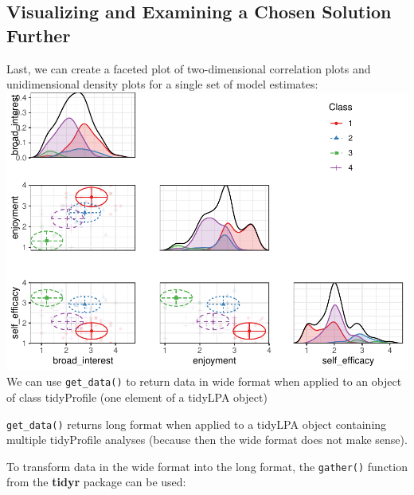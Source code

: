 \documentclass[english,man]{apa6}
\newenvironment{Shaded}{\begin{snugshade}}{\end{snugshade}}
\newcommand{\DecValTok}[1]{\textcolor[rgb]{0.00,0.00,0.81}{#1}}
\newcommand{\KeywordTok}[1]{\textcolor[rgb]{0.13,0.29,0.53}{\textbf{#1}}}
\newcommand{\NormalTok}[1]{#1}
\newcommand{\OperatorTok}[1]{\textcolor[rgb]{0.81,0.36,0.00}{\textbf{#1}}}
\newcommand{\StringTok}[1]{\textcolor[rgb]{0.31,0.60,0.02}{#1}}
\begin{document}
\hypertarget{visualizing-and-examining-a-chosen-solution-further}{%
\subsection{Visualizing and Examining a Chosen Solution Further}\label{visualizing-and-examining-a-chosen-solution-further}}

Last, we can create a faceted plot of two-dimensional correlation plots and unidimensional density plots for a single set of model estimates:
\includegraphics{paper_files/figure-latex/unnamed-chunk-11-1.pdf}
We can use \texttt{get\_data()} to return data in wide format when applied to an object
of class tidyProfile (one element of a tidyLPA object)

\texttt{get\_data()} returns long format when applied to a
tidyLPA object containing multiple tidyProfile analyses (because then the wide
format does not make sense).

To transform data in the wide format into the long format, the \texttt{gather()}
function from the \textbf{tidyr} package can be used:

\begin{Shaded}
\end{Shaded}
\end{document}
